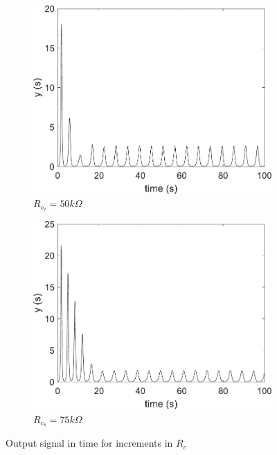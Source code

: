 \begin{figure}
        \begin{subfigure}[b]{0.22\textwidth}   
            \centering 
            \includegraphics[scale=0.28]{figs/paraCup/outParaC50.pdf}
            \caption{$R_{c_7} = 50k\Omega$}    
        \end{subfigure}
        \begin{subfigure}[b]{0.22\textwidth}
            \centering 
            \includegraphics[scale=0.28]{figs/paraCup/outParaC75.pdf}
            \caption{$R_{c_8} = 75k\Omega$}  
            \label{fig:paraCvarUpd}
        \end{subfigure}
        \caption{Output signal in time for increments in $R_c$} 
        \label{fig:paraCvarUp}
	\end{figure}
	
